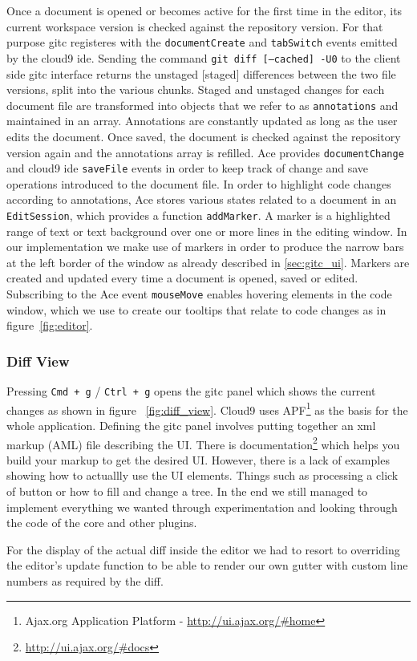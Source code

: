 Once a document is opened or becomes active for the first time in the editor, its current workspace version is checked against the repository version. 
For that purpose gitc registeres with the \texttt{documentCreate} and \texttt{tabSwitch} events emitted by the cloud9 ide. 
Sending the command \texttt{git diff [--cached] -U0} to the client side gitc interface returns the unstaged [staged] differences between the two file versions, split into the various chunks. 
Staged and unstaged changes for each document file are transformed into objects that we refer to as \texttt{annotations} and maintained in an array. Annotations are constantly updated as long as the user edits the document. 
Once saved, the document is checked against the repository version again and the annotations array is refilled. 
Ace provides \texttt{documentChange} and cloud9 ide \texttt{saveFile} events in order to keep track of change and save operations introduced to the document file. 
In order to highlight code changes according to annotations, Ace stores various states related to a document in an \texttt{EditSession}, which provides a function \texttt{addMarker}. 
A marker is a highlighted range of text or text background over one or more lines in the editing window. 
In our implementation we make use of markers in order to produce the narrow bars at the left border of the window as already described in \ref{sec:gitc_ui}. 
Markers are created and updated every time a document is opened, saved or edited. 
Subscribing to the Ace event \texttt{mouseMove} enables hovering elements in the code window, which we use to create our tooltips that relate to code changes as in figure~\ref{fig:editor}.

\subsubsection{Diff View}

Pressing \texttt{Cmd + g} / \texttt{Ctrl + g} opens the gitc panel which shows the current changes as shown in figure ~\ref{fig:diff_view}.
Cloud9 uses APF\footnote{Ajax.org Application Platform - \url{http://ui.ajax.org/#home}} as the basis for the whole application.
Defining the gitc panel involves putting together an xml markup (AML) file describing the UI.
There is documentation\footnote{\url{http://ui.ajax.org/#docs}} which helps you build your markup to get the desired UI.
However, there is a lack of examples showing how to actuallly use the UI elements. Things such as processing a click of button
or how to fill and change a tree.
In the end we still managed to implement everything we wanted through experimentation and looking through the code of the core
and other plugins.

For the display of the actual diff inside the editor we had to resort to overriding the editor's update function to be able to
render our own gutter with custom line numbers as required by the diff.
